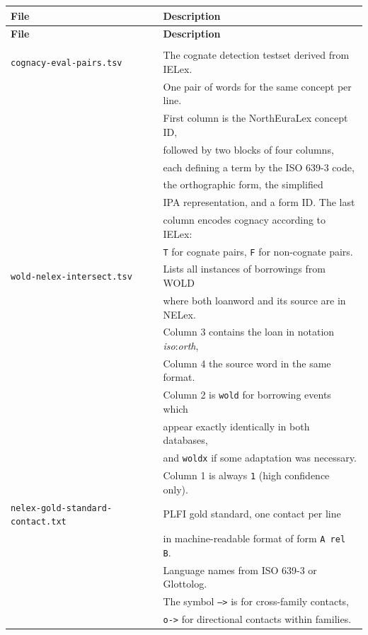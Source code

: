 \begin{center}
\small
\begin{longtable}{ll}
\hline \hline
 \textbf{File} & \textbf{Description}\\
\hline
\endfirsthead
\hline \hline
 \textbf{File} & \textbf{Description}\\
\hline
\endhead
\hline\\
\endfoot
\hline
\endlastfoot

 \texttt{cognacy-eval-pairs.tsv} 
  & The cognate detection testset derived from IELex.\\
  & One pair of words for the same concept per line.\\
  & First column is the NorthEuraLex concept ID,\\
  & followed by two blocks of four columns,\\
  & each defining a term by the ISO 639-3 code,\\
  & the orthographic form, the simplified\\
  & IPA representation, and a form ID. The last\\
  & column encodes cognacy according to IELex:\\
  & \texttt{T} for cognate pairs, \texttt{F} for non-cognate pairs.\\
 \hline
  \texttt{wold-nelex-intersect.tsv} 
  & Lists all instances of borrowings from WOLD\\
  & where both loanword and its source are in NELex.\\
  & Column 3 contains the loan in notation \textit{iso}:\textit{orth},\\
  & Column 4 the source word in the same format.\\
  & Column 2 is \texttt{wold} for borrowing events which\\
  & appear exactly identically in both databases,\\
  & and \texttt{woldx} if some adaptation was necessary.\\
  & Column 1 is always \texttt{1} (high confidence only).\\
 \hline
  \texttt{nelex-gold-standard-contact.txt} 
  & PLFI gold standard, one contact per line\\
  & in machine-readable format of form \texttt{A rel B}.\\
  & Language names from ISO 639-3 or Glottolog.\\
  & The symbol \texttt{-->} is for cross-family contacts,\\
  & \texttt{o->} for directional contacts within families.\\

\end{longtable}
\end{center}
